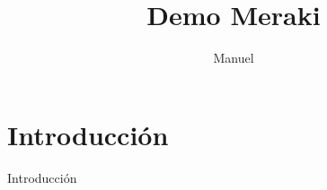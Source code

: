 \documentclass{article}
\begin{document}


\title{Demo Meraki}
\author{Manuel}
\maketitle
\newpage

\section{Introducción}
Introducción
\end{document}
